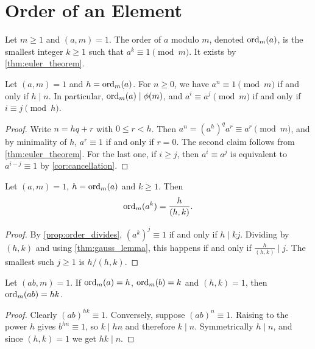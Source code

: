 \section{Order of an Element}

\begin{definition}[Order]\label{def:order}
    Let $m \ge 1$ and $(a,m) = 1$. The order of $a$ modulo $m$, denoted $\operatorname{ord}_m(a)$, is the smallest integer $k \ge 1$ such that $a^k \equiv 1 \pmod m$. It exists by \cref{thm:euler_theorem}.
\end{definition}

\begin{proposition}\label{prop:order_divides}
    Let $(a,m) = 1$ and $h = \operatorname{ord}_m(a)$. For $n \ge 0$, we have $a^n \equiv 1 \pmod m$ if and only if $h \mid n$. In particular, $\ord_m(a) \mid \phi(m)$, and $a^i \equiv a^j \pmod m$ if and only if $i \equiv j \pmod h$.
\end{proposition}
\begin{proof}
    Write $n = hq + r$ with $0 \le r < h$. Then $a^n = (a^h)^q a^r \equiv a^r \pmod m$, and by minimality of $h$, $a^r \equiv 1$ if and only if $r = 0$. The second claim follows from \cref{thm:euler_theorem}. For the last one, if $i \ge j$, then $a^i \equiv a^j$ is equivalent to $a^{i-j} \equiv 1$ by \cref{cor:cancellation}.
\end{proof}

\begin{proposition}\label{prop:order_of_power}
    Let $(a,m) = 1$, $h = \operatorname{ord}_m(a)$ and $k \ge 1$. Then
    \begin{equation*}
        \operatorname{ord}_m(a^k) = \frac{h}{(h,k)}.
    \end{equation*}
\end{proposition}
\begin{proof}
    By \cref{prop:order_divides}, $(a^k)^j \equiv 1$ if and only if $h \mid kj$. Dividing by $(h,k)$ and using \cref{thm:gauss_lemma}, this happens if and only if $\frac{h}{(h,k)} \mid j$. The smallest such $j \ge 1$ is $h/(h,k)$.
\end{proof}

\begin{lemma}\label{lem:order_product}
    Let $(ab,m) = 1$. If $\operatorname{ord}_m(a) = h$, $\operatorname{ord}_m(b) = k$ and $(h,k) = 1$, then $\operatorname{ord}_m(ab) = hk$.
\end{lemma}
\begin{proof}
    Clearly $(ab)^{hk} \equiv 1$. Conversely, suppose $(ab)^n \equiv 1$. Raising to the power $h$ gives $b^{hn} \equiv 1$, so $k \mid hn$ and therefore $k \mid n$. Symmetrically $h \mid n$, and since $(h,k) = 1$ we get $hk \mid n$.
\end{proof}

